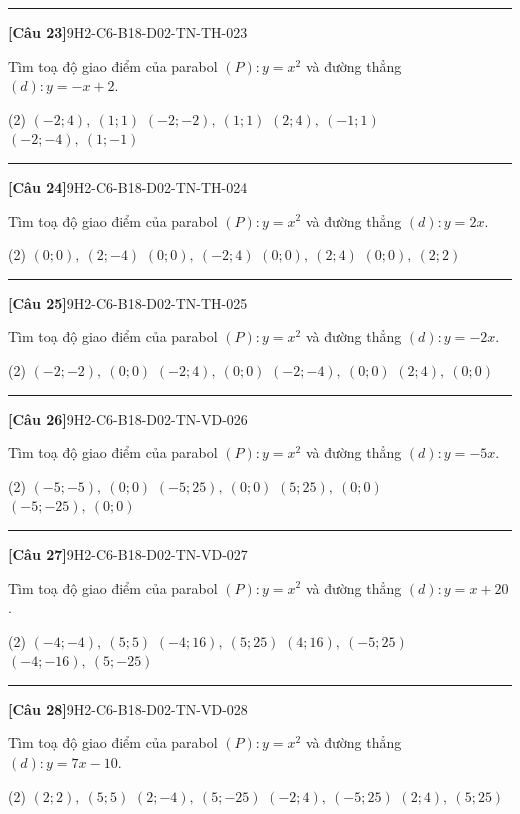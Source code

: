 \documentclass[12pt,a4paper]{article}
\newif\ifloigiai
\newenvironment{cauhoi}[2]{%
  \par\medskip\noindent\rule{\textwidth}{0.4pt}\par\nopagebreak
  \noindent\textbf{[#1]}\hfill{\scriptsize\ttfamily #2}\par\nopagebreak\smallskip}{\par}
\newcommand{\dapan}[1]{\ifloigiai\par\smallskip\noindent\textit{Đáp án:} \textbf{#1}\par\fi}
\begin{document}
\begin{cauhoi}{Câu 23}{9H2-C6-B18-D02-TN-TH-023}
Tìm toạ độ giao điểm của parabol $(P): y=x^{2}$ và đường thẳng $(d): y=-x+2$.
\begin{tasks}(2)
\task $(-2;4),\ (1;1)$
\task $(-2;-2),\ (1;1)$
\task $(2;4),\ (-1;1)$
\task $(-2;-4),\ (1;-1)$
\end{tasks}
\dapan{A}
\end{cauhoi}
\begin{cauhoi}{Câu 24}{9H2-C6-B18-D02-TN-TH-024}
Tìm toạ độ giao điểm của parabol $(P): y=x^{2}$ và đường thẳng $(d): y=2x$.
\begin{tasks}(2)
\task $(0;0),\ (2;-4)$
\task $(0;0),\ (-2;4)$
\task $(0;0),\ (2;4)$
\task $(0;0),\ (2;2)$
\end{tasks}
\dapan{C}
\end{cauhoi}
\begin{cauhoi}{Câu 25}{9H2-C6-B18-D02-TN-TH-025}
Tìm toạ độ giao điểm của parabol $(P): y=x^{2}$ và đường thẳng $(d): y=-2x$.
\begin{tasks}(2)
\task $(-2;-2),\ (0;0)$
\task $(-2;4),\ (0;0)$
\task $(-2;-4),\ (0;0)$
\task $(2;4),\ (0;0)$
\end{tasks}
\dapan{B}
\end{cauhoi}
\begin{cauhoi}{Câu 26}{9H2-C6-B18-D02-TN-VD-026}
Tìm toạ độ giao điểm của parabol $(P): y=x^{2}$ và đường thẳng $(d): y=-5x$.
\begin{tasks}(2)
\task $(-5;-5),\ (0;0)$
\task $(-5;25),\ (0;0)$
\task $(5;25),\ (0;0)$
\task $(-5;-25),\ (0;0)$
\end{tasks}
\dapan{B}
\end{cauhoi}
\begin{cauhoi}{Câu 27}{9H2-C6-B18-D02-TN-VD-027}
Tìm toạ độ giao điểm của parabol $(P): y=x^{2}$ và đường thẳng $(d): y=x+20$.
\begin{tasks}(2)
\task $(-4;-4),\ (5;5)$
\task $(-4;16),\ (5;25)$
\task $(4;16),\ (-5;25)$
\task $(-4;-16),\ (5;-25)$
\end{tasks}
\dapan{B}
\end{cauhoi}
\begin{cauhoi}{Câu 28}{9H2-C6-B18-D02-TN-VD-028}
Tìm toạ độ giao điểm của parabol $(P): y=x^{2}$ và đường thẳng $(d): y=7x-10$.
\begin{tasks}(2)
\task $(2;2),\ (5;5)$
\task $(2;-4),\ (5;-25)$
\task $(-2;4),\ (-5;25)$
\task $(2;4),\ (5;25)$
\end{tasks}
\dapan{D}
\end{cauhoi}
\end{document}

